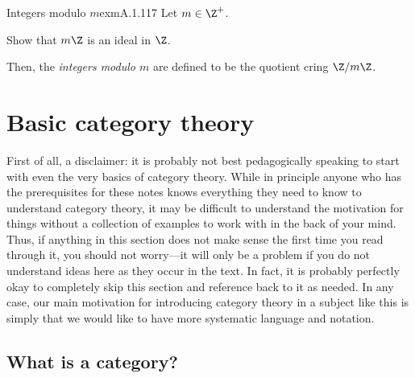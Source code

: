\begin{exm}{Integers modulo $m$}{exmA.1.117}
Let $m\in \Z ^+$.
\begin{exr}[breakable=false]{}{}
Show that $m\Z$ is an ideal in $\Z$.
\end{exr}
Then, the \emph{integers modulo $m$} are defined to be the quotient cring $\Z /m\Z$.
\end{exm}

\cleardoublepage
\chapter{Basic category theory}

First of all, a disclaimer:  it is probably not best pedagogically speaking to start with even the very basics of category theory.  While in principle anyone who has the prerequisites for these notes knows everything they need to know to understand category theory, it may be difficult to understand the motivation for things without a collection of examples to work with in the back of your mind.  Thus, if anything in this section does not make sense the first time you read through it, you should not worry---it will only be a problem if you do not understand ideas here as they occur in the text.  In fact, it is probably perfectly okay to completely skip this section and reference back to it as needed.  In any case, our main motivation for introducing category theory in a subject like this is simply that we would like to have more systematic language and notation.

\section{What is a category?}

